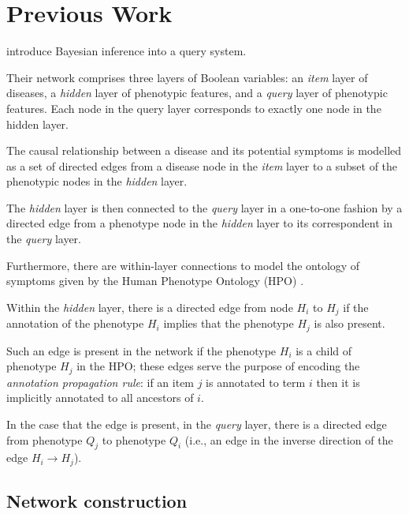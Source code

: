 \section{Previous Work}
\label{sec:lit-rev}

\cite{bauer2012bayesian} introduce Bayesian inference into a query system.

Their network comprises three layers of Boolean variables: an {\it item} layer of diseases, a {\it hidden} layer of phenotypic features, and a {\it query} layer of phenotypic features.
Each node in the query layer corresponds to exactly one node in the hidden layer.

The causal relationship between a disease and its potential symptoms is modelled as a set of directed edges from a disease node in the {\it item} layer to a subset of the phenotypic nodes in the {\it hidden} layer.

The {\it hidden} layer is then connected to the {\it query} layer in a one-to-one fashion by a directed edge from a phenotype node in the {\it hidden} layer to its correspondent in the {\it query} layer.

Furthermore, there are within-layer connections to model the ontology of symptoms given by the Human Phenotype Ontology (HPO) \cite{kohler2014hpo}.

Within the {\it hidden} layer, there is a directed edge from node $H_i$ to $H_j$ if the annotation of the phenotype $H_i$ implies that the phenotype $H_j$ is also present.

Such an edge is present in the network if the phenotype $H_i$ is a child of phenotype $H_j$ in the HPO; these edges serve the purpose of encoding the {\it annotation propagation rule}: if an item $j$ is annotated to term $i$ then it is implicitly annotated to all ancestors of $i$.

In the case that the edge is present, in the {\it query} layer, there is a directed edge from phenotype $Q_j$ to phenotype $Q_i$ (i.e., an edge in the inverse direction of the edge $H_i \to H_j$).

%

\subsection*{Network construction}

